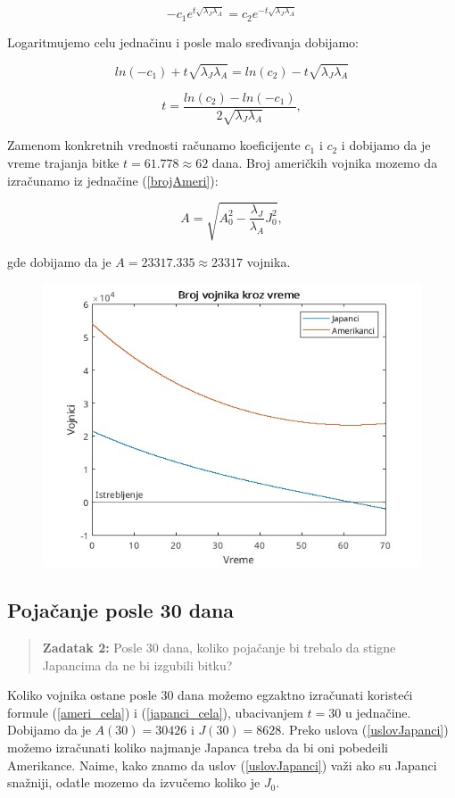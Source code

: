 \documentclass{article}
\newcommand{\laj}{\sqrt{\lambda_J\lambda_A}}
\begin{document}
\[
  -c_1 e^{t \laj} = c_2 e^{-t \laj}
\]

Logaritmujemo celu jednačinu i posle malo sređivanja dobijamo:

\[
  ln(-c_1) + t\laj= ln(c_2) - t\laj
\]

\[
  t = \frac{ln(c_2) - ln(-c_1)}{2\laj}, 
\]

Zamenom konkretnih vrednosti računamo koeficijente \(c_1\) i \(c_2\) i dobijamo da je vreme trajanja bitke \(t = 61.778 \approx 62\) dana.
Broj američkih vojnika mozemo da izračunamo iz jednačine (\ref{brojAmeri}): 

\[
  A = \sqrt{A_{0}^2 - \frac{\lambda_J}{\lambda_A}J_0^2},
\]

gde dobijamo da je \(A =23 317.335 \approx 23 317\) vojnika.


\begin{figure}[htbp]
    \center
    \includegraphics[scale=0.6]{img/bitka.jpg}
\end{figure}

\subsection{Pojačanje posle 30 dana}

\vspace{2mm}
\begin{quote}
\textbf{Zadatak 2:}
  Posle 30 dana, koliko pojačanje bi trebalo da stigne Japancima da ne bi
  izgubili bitku?
\end{quote}

\hspace{2mm}
Koliko vojnika ostane posle 30 dana možemo egzaktno izračunati koristeći formule
(\ref{ameri_cela}) i (\ref{japanci_cela}), ubacivanjem \(t = 30\) u jednačine.
Dobijamo da je \(A(30) = 30426\) i \(J(30) = 8628\). Preko uslova
(\ref{uslovJapanci}) možemo izračunati koliko najmanje Japanca treba da bi oni
pobedeili Amerikance. Naime, kako znamo da uslov (\ref{uslovJapanci}) važi ako
su Japanci snažniji, odatle mozemo da izvučemo koliko je \(J_0\).
\end{document}
